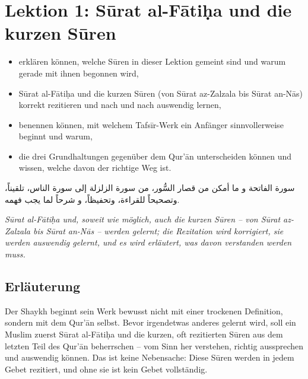 
\section*{Lektion 1: Sūrat al-Fātiḥa und die kurzen Sūren}

\begin{lernziele}
\begin{itemize}[leftmargin=1.4em]
  \item erklären können, welche Sūren in dieser Lektion gemeint sind und warum gerade mit
        ihnen begonnen wird,
  \item Sūrat al-Fātiḥa und die kurzen Sūren (von Sūrat az-Zalzala bis Sūrat an-Nās) korrekt
        rezitieren und nach und nach auswendig lernen,
  \item benennen können, mit welchem Tafsīr-Werk ein Anfänger sinnvollerweise beginnt und
        warum,
  \item die drei Grundhaltungen gegenüber dem Qur’ān unterscheiden können und wissen,
        welche davon der richtige Weg ist.
\end{itemize}
\end{lernziele}

\begin{shaykhsagt}
{\arabicfont\begin{Arabic}
سورة الفاتحة و ما أمكن من قصار السُّور، من سورة الزلزلة إلى سورة الناس، تلقيناً، وتصحيحاً
للقراءة، وتحفيظاً، و شرحاً لما يجب فهمه.
\end{Arabic}}

\vspace{2mm}
\emph{Sūrat al-Fātiḥa und, soweit wie möglich, auch die kurzen Sūren – von Sūrat az-Zalzala bis
Sūrat an-Nās – werden gelernt; die Rezitation wird korrigiert, sie werden auswendig gelernt, und
es wird erläutert, was davon verstanden werden muss.}
\end{shaykhsagt}

\subsection*{Erläuterung}

Der Shaykh  beginnt sein Werk bewusst nicht mit einer trockenen Definition, sondern
mit dem Qur’ān selbst. Bevor irgendetwas anderes gelernt wird, soll ein Muslim zuerst
Sūrat al-Fātiḥa und die kurzen, oft rezitierten Sūren aus dem letzten Teil des Qur’ān beherrschen
– vom Sinn her verstehen, richtig aussprechen und auswendig können. Das ist keine Nebensache:
Diese Sūren werden in jedem Gebet rezitiert, und ohne sie ist kein Gebet vollständig.

